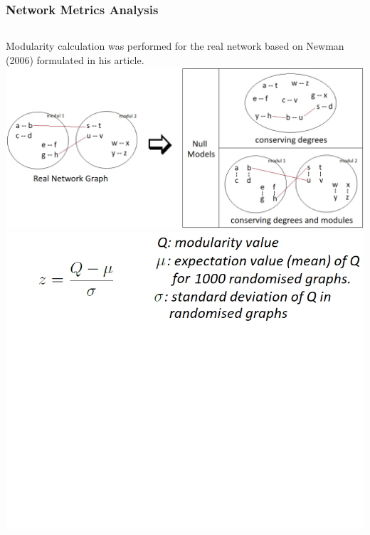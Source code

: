 \begin{frame}
	\frametitle{Network Metrics Analysis}
	\begin{columns}[c]
		Modularity calculation was performed for the real network based on Newman (2006) formulated in his article.
		\includegraphics[width=\linewidth]{../tables/cartoon-null-model-definitions.png}
		\includegraphics[width=\textwidth]{../tables/expected_network_structures_1.png}
	\end{columns}
\end{frame}
